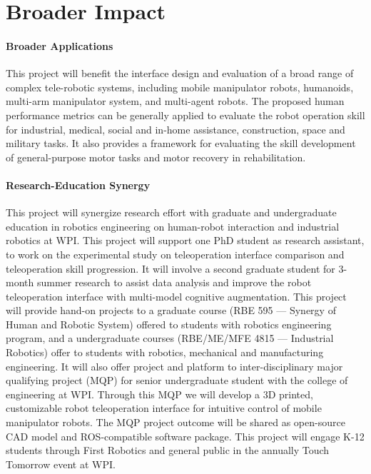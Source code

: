 
\section{Broader Impact}\label{sec:impact}

\paragraph{Broader Applications} This project will benefit the interface design and evaluation of a broad range of complex tele-robotic systems, including mobile manipulator robots, humanoids, multi-arm manipulator system, and multi-agent robots. The proposed human performance metrics can be generally applied to evaluate the robot operation skill for industrial, medical, social and in-home assistance, construction, space and military tasks. It also provides a framework for evaluating the skill development of general-purpose motor tasks and motor recovery in rehabilitation.  

\paragraph{Research-Education Synergy} This project will synergize research effort with graduate and undergraduate education in robotics engineering on human-robot interaction and industrial robotics at WPI. This project will support one PhD student as research assistant, to work on the experimental study on teleoperation interface comparison and teleoperation skill progression. It will involve a second graduate student for 3-month summer research to assist data analysis and improve the robot teleoperation interface with multi-model cognitive augmentation. This project will provide hand-on projects to a graduate course (RBE 595 --- Synergy of Human and Robotic System) offered to students with robotics engineering program, and a undergraduate courses (RBE/ME/MFE 4815 --- Industrial Robotics) offer to students with robotics, mechanical and manufacturing engineering. It will also offer project and platform to inter-disciplinary major qualifying project (MQP) for senior undergraduate student with the college of engineering at WPI. Through this MQP we will develop a 3D printed, customizable robot teleoperation interface for intuitive control of mobile manipulator robots. The MQP project outcome will be shared as open-source CAD model and ROS-compatible software package. This project will engage K-12 students through First Robotics and general public in the annually Touch Tomorrow event at WPI.

